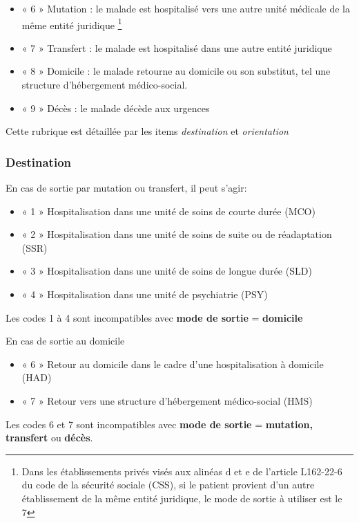 \documentclass[12pt,english,french,twoside]{book}\usepackage[]{graphicx}\usepackage[]{color}
\begin{document}
\begin{itemize}
  \item « 6 » Mutation : le malade est hospitalisé vers une autre unité médicale de la même
entité juridique \footnote{Dans les établissements privés visés aux alinéas d et e de l'article L162-22-6 du code de la sécurité sociale (CSS), si le patient provient d’un autre établissement de la même entité juridique, le mode de sortie à utiliser est le 7}
  \item « 7 » Transfert : le malade est hospitalisé dans une autre entité juridique
  \item « 8 » Domicile : le malade retourne au domicile ou son substitut, tel une
structure d'hébergement médico-social.
  \item « 9 » Décès : le malade décède aux urgences
\end{itemize}

Cette rubrique est détaillée par les items \emph{destination} et \emph{orientation}

\subsubsection{Destination}

En cas de sortie par mutation ou transfert, il peut s'agir:
\begin{itemize}
  \item « 1 » Hospitalisation dans une unité de soins de courte durée (MCO)
  \item « 2 » Hospitalisation dans une unité de soins de suite ou de réadaptation (SSR)
  \item « 3 » Hospitalisation dans une unité de soins de longue durée (SLD)
  \item « 4 » Hospitalisation dans une unité de psychiatrie (PSY)
\end{itemize}
Les codes 1 à 4 sont incompatibles avec \textbf{mode de sortie} = \textbf{domicile}

En cas de sortie au domicile
\begin{itemize}
  \item « 6 » Retour au domicile dans le cadre d’une hospitalisation à domicile (HAD)
  \item « 7 » Retour vers une structure d'hébergement médico-social (HMS)
\end{itemize}
Les codes 6 et 7 sont incompatibles avec \textbf{mode de sortie} = \textbf{mutation, transfert} ou \textbf{décès}.
\end{document}
